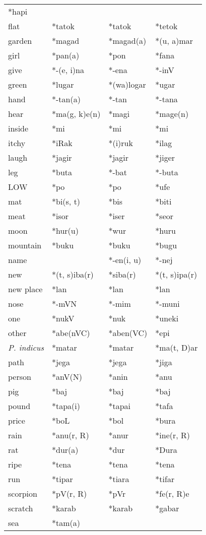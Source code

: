 \begin{center}
\begin{supertabular}{m{0.9011598in}m{0.81295985in}m{0.81295985in}m{0.83515984in}}
*hapi\\
flat &
*tatok &
*tatok &
*tetok\\
garden &
*magad &
*magad(a) &
*(u, a)mar\\
girl &
*pan(a) &
*pon &
*fana\\
give &
*-(e, i)na &
*-ena &
*-inV\\
green &
*lugar &
*(wa)logar &
*ugar\\
hand &
*-tan(a) &
*-tan &
*-tana\\
hear &
*ma(g, k)e(n) &
*magi &
*mage(n)\\
inside &
*mi &
*mi &
*mi\\
itchy &
*iRak &
*(i)ruk &
*ilag\\
laugh &
*jagir &
*jagir &
*jiger\\
leg &
*buta &
*-bat &
*-buta\\
LOW &
*po &
*po &
*ufe\\
mat &
*bi(s, t) &
*bis &
*biti\\
meat &
*isor &
*iser &
*seor\\
moon &
*hur(u) &
*wur &
*huru\\
mountain &
*buku &
*buku &
*bugu\\
name &
 &
*-en(i, u) &
*-nej\\
new &
*(t, s)iba(r) &
*siba(r) &
*(t, s)ipa(r)\\
new place &
*lan &
*lan &
*lan\\
nose &
*-mVN &
*-mim &
*-muni\\
one &
*nukV &
*nuk &
*uneki\\
other &
*abe(nVC) &
*aben(VC) &
*epi\\
\textit{P. indicus} &
*matar &
*matar &
*ma(t, D)ar\\
path &
*jega &
*jega &
*jiga\\
person &
*anV(N) &
*anin &
*anu\\
pig &
*baj &
*baj &
*baj\\
pound &
*tapa(i) &
*tapai &
*tafa\\
price &
*boL &
*bol &
*bura\\
rain &
*anu(r, R) &
*anur &
*ine(r, R)\\
rat &
*dur(a) &
*dur &
*Dura\\
ripe &
*tena &
*tena &
*tena\\
run &
*tipar &
*tiara &
*tifar\\
scorpion &
*pV(r, R) &
*pVr &
*fe(r, R)e\\
scratch &
*karab &
*karab &
*gabar\\
sea &
*tam(a) &

\end{supertabular}
\end{center}
